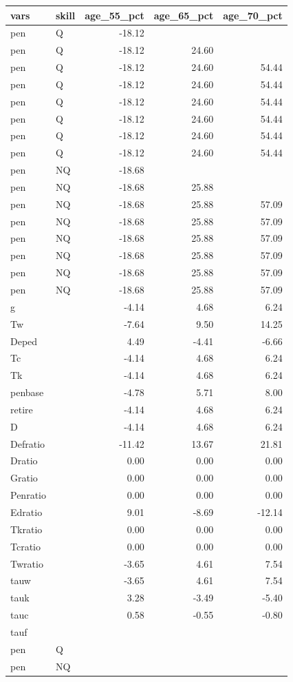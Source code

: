 \begin{tabular}{llrrr}
  \hline
vars & skill & age\_55\_pct & age\_65\_pct & age\_70\_pct \\ 
  \hline
pen & Q & -18.12 &  &  \\ 
  pen & Q & -18.12 & 24.60 &  \\ 
  pen & Q & -18.12 & 24.60 & 54.44 \\ 
  pen & Q & -18.12 & 24.60 & 54.44 \\ 
  pen & Q & -18.12 & 24.60 & 54.44 \\ 
  pen & Q & -18.12 & 24.60 & 54.44 \\ 
  pen & Q & -18.12 & 24.60 & 54.44 \\ 
  pen & Q & -18.12 & 24.60 & 54.44 \\ 
  pen & NQ & -18.68 &  &  \\ 
  pen & NQ & -18.68 & 25.88 &  \\ 
  pen & NQ & -18.68 & 25.88 & 57.09 \\ 
  pen & NQ & -18.68 & 25.88 & 57.09 \\ 
  pen & NQ & -18.68 & 25.88 & 57.09 \\ 
  pen & NQ & -18.68 & 25.88 & 57.09 \\ 
  pen & NQ & -18.68 & 25.88 & 57.09 \\ 
  pen & NQ & -18.68 & 25.88 & 57.09 \\ 
  g &  & -4.14 & 4.68 & 6.24 \\ 
  Tw &  & -7.64 & 9.50 & 14.25 \\ 
  Deped &  & 4.49 & -4.41 & -6.66 \\ 
  Tc &  & -4.14 & 4.68 & 6.24 \\ 
  Tk &  & -4.14 & 4.68 & 6.24 \\ 
  penbase &  & -4.78 & 5.71 & 8.00 \\ 
  retire &  & -4.14 & 4.68 & 6.24 \\ 
  D &  & -4.14 & 4.68 & 6.24 \\ 
  Defratio &  & -11.42 & 13.67 & 21.81 \\ 
  Dratio &  & 0.00 & 0.00 & 0.00 \\ 
  Gratio &  & 0.00 & 0.00 & 0.00 \\ 
  Penratio &  & 0.00 & 0.00 & 0.00 \\ 
  Edratio &  & 9.01 & -8.69 & -12.14 \\ 
  Tkratio &  & 0.00 & 0.00 & 0.00 \\ 
  Tcratio &  & 0.00 & 0.00 & 0.00 \\ 
  Twratio &  & -3.65 & 4.61 & 7.54 \\ 
  tauw &  & -3.65 & 4.61 & 7.54 \\ 
  tauk &  & 3.28 & -3.49 & -5.40 \\ 
  tauc &  & 0.58 & -0.55 & -0.80 \\ 
  tauf &  &  &  &  \\ 
  pen & Q &  &  &  \\ 
  pen & NQ &  &  &  \\ 
   \hline
\end{tabular}
